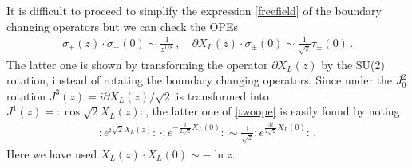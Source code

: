 \documentclass[12pt]{article}
\begin{document}
It is difficult to proceed to simplify the expression
\eqref{freefield} of the boundary changing operators but we can check
the OPEs
\begin{align}
\sigma_+(z)\cdot\sigma_-(0)\sim\frac{1}{z^{1/8}}\,,\quad
\partial X_L(z)\cdot\sigma_\pm(0)\sim\frac{1}{\sqrt{z}}\tau_\pm(0)\,.
\label{twoope}
\end{align}
The latter one is shown by transforming the operator $\partial X_L(z)$
by the SU(2) rotation, instead of rotating the boundary changing
operators.
Since under the $J^2_0$ rotation $J^3(z)=i\partial X_L(z)/\sqrt{2}$ is
transformed into $J^1(z)=:\cos\sqrt{2}X_L(z):$, the latter one of
\eqref{twoope} is easily found by noting
\begin{align}
:e^{i\sqrt{2}X_L(z)}:\,
\cdot:e^{-\frac{i}{2\sqrt{2}}X_L(0)}:
\sim\frac{1}{\sqrt{z}}
:e^{\frac{3i}{2\sqrt{2}}X_L(0)}:\,.
\end{align}
Here we have used $X_L(z)\cdot X_L(0)\sim -\ln z$.
\end{document}
